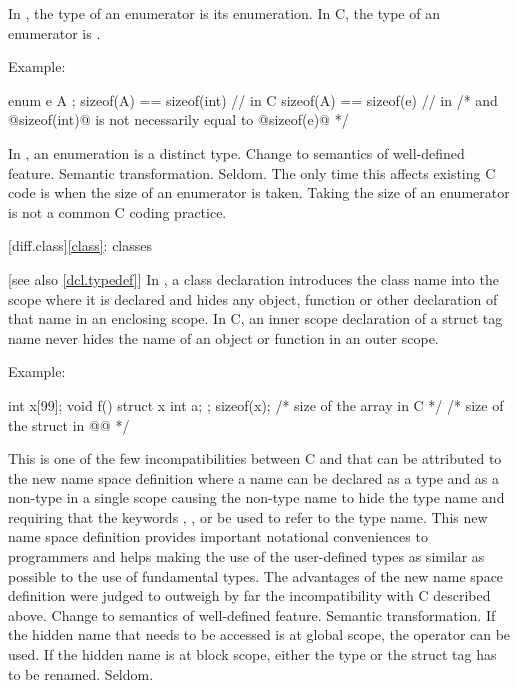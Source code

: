 \change
In \Cpp{}, the type of an enumerator is its enumeration. In C, the type of an enumerator is .

Example:
\begin{codeblock}
enum e { A };
sizeof(A) == sizeof(int)        // in C
sizeof(A) == sizeof(e)          // in \Cpp{}
/* and @sizeof(int)@ is not necessarily equal to @sizeof(e)@ */
\end{codeblock}

\rationale
In \Cpp{}, an enumeration is a distinct type.
\effect
Change to semantics of well-defined feature.
\difficulty
Semantic transformation.
\howwide
Seldom.
The only time this affects existing C code is when the size of an
enumerator is taken.
Taking the size of an enumerator is not a
common C coding practice.

[diff.class]{\ref{class}: classes}

 [see also \ref{dcl.typedef}]
\change
In \Cpp{}, a class declaration introduces the class name into the scope where it is
declared and hides any object, function or other declaration of that name in an enclosing
scope. In C, an inner scope declaration of a struct tag name never hides the name of an
object or function in an outer scope.

Example:
\begin{codeblock}
int x[99];
void f() {
  struct x { int a; };
  sizeof(x);  /* size of the array in C */
  /* size of the struct in @\textit{\textrm{\Cpp{}}}@ */
}
\end{codeblock}
\rationale
This is one of the few incompatibilities between C and \Cpp{} that
can be attributed to the new \Cpp{} name space definition where a
name can be declared as a type and as a non-type in a single scope
causing the non-type name to hide the type name and requiring that
the keywords , ,  or  be used to refer to the type name.
This new name space definition provides important notational
conveniences to \Cpp{} programmers and helps making the use of the
user-defined types as similar as possible to the use of fundamental
types.
The advantages of the new name space definition were judged to
outweigh by far the incompatibility with C described above.
\effect
Change to semantics of well-defined feature.
\difficulty
Semantic transformation.
If the hidden name that needs to be accessed is at global scope,
the \tcode{::} \Cpp{} operator can be used.
If the hidden name is at block scope, either the type or the struct
tag has to be renamed.
\howwide
Seldom.

